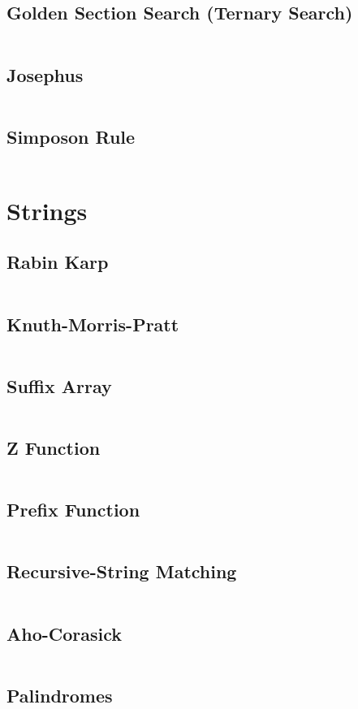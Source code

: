\documentclass[a4paper, 10pt, twocolumn, landscape]{article}
\begin{document}
  \subsection{Golden Section Search (Ternary Search)}
  \inputminted{cpp}{math/gss.cpp}
  \subsection{Josephus}
  \inputminted{cpp}{math/josephus.cpp}
  \subsection{Simposon Rule}
  \inputminted{cpp}{math/simpson-rule.cpp}

  \section{Strings}
  \subsection{Rabin Karp}
  \inputminted{cpp}{strings/rabin-karp.cpp}
  \subsection{Knuth-Morris-Pratt}
  \inputminted{cpp}{strings/kmp.cpp}
  \subsection{Suffix Array}
  \inputminted{cpp}{strings/suffix-array.cpp}
  \subsection{Z Function}
  \inputminted{cpp}{strings/z.cpp}
  \subsection{Prefix Function}
  \inputminted{cpp}{strings/prefix.cpp}
  \subsection{Recursive-String Matching}
  \inputminted{cpp}{strings/recursive-string-matching.cpp}
  \subsection{Aho-Corasick}
  \inputminted{cpp}{strings/aho.cpp}
  \subsection{Palindromes}
  \inputminted{cpp}{strings/manacher.cpp}
\end{document}
